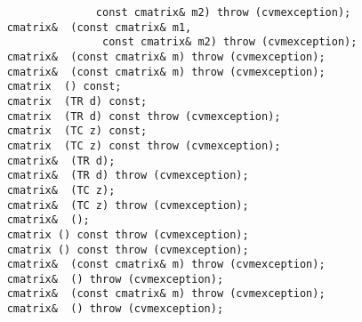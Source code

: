 \verb"                  const cmatrix& m2) throw (cvmexception);"\\
\verb"    cmatrix& "\verb" (const cmatrix& m1,"\\
\verb"                   const cmatrix& m2) throw (cvmexception);"\\
\verb"    cmatrix& "\verb" (const cmatrix& m) throw (cvmexception);"\\
\verb"    cmatrix& "\verb" (const cmatrix& m) throw (cvmexception);"\\
\verb"    cmatrix "\verb" () const;"\\
\verb"    cmatrix "\verb" (TR d) const;"\\
\verb"    cmatrix "\verb" (TR d) const throw (cvmexception);"\\
\verb"    cmatrix "\verb" (TC z) const;"\\
\verb"    cmatrix "\verb" (TC z) const throw (cvmexception);"\\
\verb"    cmatrix& "\verb" (TR d);"\\
\verb"    cmatrix& "\verb" (TR d) throw (cvmexception);"\\
\verb"    cmatrix& "\verb" (TC z);"\\
\verb"    cmatrix& "\verb" (TC z) throw (cvmexception);"\\
\verb"    cmatrix& "\verb" ();"\\
\verb"    cmatrix "\verb"() const throw (cvmexception);"\\
\verb"    cmatrix "\verb"() const throw (cvmexception);"\\
\verb"    cmatrix& "\verb" (const cmatrix& m) throw (cvmexception);"\\
\verb"    cmatrix& "\verb" () throw (cvmexception);"\\
\verb"    cmatrix& "\verb" (const cmatrix& m) throw (cvmexception);"\\
\verb"    cmatrix& "\verb" () throw (cvmexception);"\\
